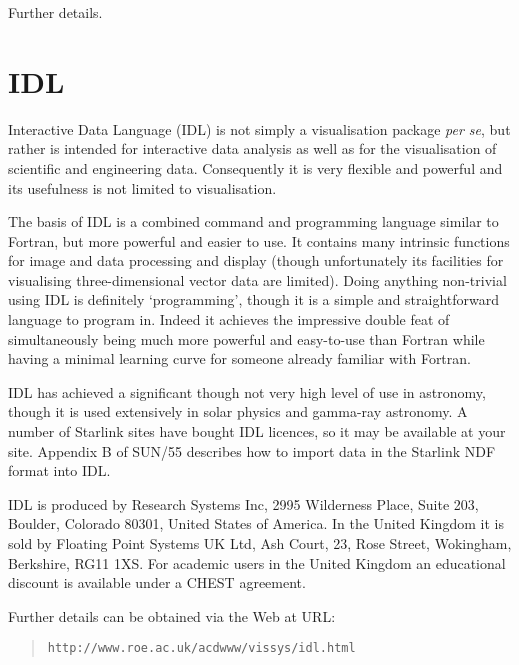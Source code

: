 \documentclass[twoside,11pt]{article}
\newcommand{\htmladdnormallink}[2]{#1}
\newenvironment{latexonly}{}{}
\newcommand{\xref}[3]{#1}
\newcommand{\xlabel}[1]{}
\begin{document}
\begin{htmlonly}
\htmladdnormallink{Further details}
{http://www.roe.ac.uk/acdwww/vissys/khoros.html}.
\end{htmlonly}


\section{IDL \label{IDL} \xlabel{IDL} }

Interactive Data Language (IDL) is not simply a visualisation package
{\it per se}, but rather is intended for interactive data analysis as
well as for the visualisation of scientific and engineering data.
Consequently it is very flexible and powerful and its usefulness is not
limited to visualisation.

The basis of IDL is a combined command and programming language similar
to Fortran, but more powerful and easier to use. It contains many
intrinsic functions for image and data processing and display (though
unfortunately its facilities for visualising three-dimensional vector
data are limited). Doing anything non-trivial using IDL is definitely
`programming', though it is a simple and straightforward language to
program in. Indeed it achieves the impressive double feat of
simultaneously being much more powerful and easy-to-use than Fortran
while having a minimal learning curve for someone already familiar with
Fortran.

IDL has achieved a significant though not very high level of use in
astronomy, though it is used extensively in solar physics and gamma-ray
astronomy. A number of Starlink sites have bought IDL licences, so it
may be available at your site.  Appendix B of
\xref{SUN/55}{sun55}{}\cite{SUN55} describes how to import data in the
Starlink NDF format into IDL.

IDL is produced by Research Systems Inc, 2995 Wilderness Place, Suite
203, Boulder, Colorado 80301, United States of America.  In the United
Kingdom it is sold by Floating Point Systems UK Ltd, Ash Court, 23, Rose
Street, Wokingham, Berkshire, RG11 1XS. For academic users in the
United Kingdom an educational discount is available under a CHEST
agreement.

\begin{latexonly}
Further details can be obtained via the Web at URL:

\begin{quote}
{\tt http://www.roe.ac.uk/acdwww/vissys/idl.html}
\end{quote}
\end{latexonly}
\end{document}
